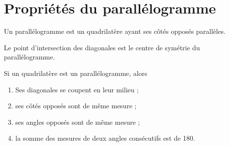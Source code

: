 \documentclass[11pt]{article}
\begin{document}
\section{Propriétés du parallélogramme}

\begin{definition}
Un parallélogramme est un quadrilatère ayant ses côtés opposés parallèles.
\end{definition}

\begin{exemple}
\begin{center}
\end{center}
\end{exemple}

\begin{propriete}
Le point d'intersection des diagonales est le centre de symétrie du parallélogramme.
\end{propriete}

\begin{propriete}
Si un quadrilatère est un parallélogramme, alors
\begin{enumerate}
\item Ses diagonales se coupent en leur milieu ; 
\item ses côtés opposés sont de même mesure ; 
\item ses angles opposés sont de même mesure ; 
\item la somme des mesures de deux angles consécutifs est de 180\degre.
\end{enumerate}
\end{propriete}

\begin{exemple}
\begin{center}
\end{center}
\end{exemple}
\end{document}
